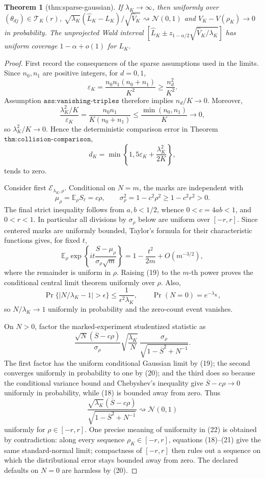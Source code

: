 \documentclass{article}
\newtheorem{theorem}{Theorem}
\begin{document}
\begin{theorem}[thm:sparse-gaussian]\label{thm:sparse-gaussian}
If \(\lambda_K\to\infty\), then uniformly over \((\theta_{dj})\in\mathcal T_K(r)\), \(\sqrt{\lambda_K}(\widehat L_K-L_K)/\sqrt{\widehat V_K}\rightsquigarrow\mathcal N(0,1)\) and \(\widehat V_K-V(\rho_K)\to0\) in probability. The unprojected Wald interval \([\widehat L_K\pm z_{1-\alpha/2}\sqrt{\widehat V_K/\lambda_K}]\) has uniform coverage \(1-\alpha+o(1)\) for \(L_K\).
\end{theorem}
\begin{proof}
First record the consequences of the sparse assumptions used in the
limits.  Since \(n_0,n_1\) are positive integers, for \(d=0,1\),
\[
 \varepsilon_K
 =\frac{n_0n_1(n_0+n_1)}{K^2}
 \ge \frac{n_d^2}{K^2}.
 \tag{15}
\]
Assumption \(\texttt{ass:vanishing-triples}\) therefore implies
\(n_d/K\to0\).  Moreover,
\[
 \frac{\lambda_K^2/K}{\varepsilon_K}
 =
 \frac{n_0n_1}{K(n_0+n_1)}
 \le\frac{\min(n_0,n_1)}K
 \longrightarrow0,
 \tag{16}
\]
so \(\lambda_K^2/K\to0\).  Hence the deterministic comparison error in
Theorem \(\texttt{thm:collision-comparison}\),
\[
 d_K=\min\left\{1,5\varepsilon_K+\frac{\lambda_K^2}{2K}\right\},
 \tag{17}
\]
tends to zero.

Consider first \(\mathcal E_{\lambda_K,\rho}\).  Conditional on \(N=m\),
the marks are independent with
\[
 \mu_\rho=\mathbb E_\rho S_\ell=c\rho,
 \qquad
 \sigma_\rho^2=1-c^2\rho^2
 \ge1-c^2r^2>0.
 \tag{18}
\]
The final strict inequality follows from \(a,b<1/2\), whence
\(0<c=4ab<1\), and \(0<r<1\).  In particular all divisions by
\(\sigma_\rho\) below are uniform over \([-r,r]\).  Since centered marks
are uniformly bounded, Taylor's formula for their characteristic
functions gives, for fixed \(t\),
\[
 \mathbb E_\rho\exp\left\{
 it\frac{S-\mu_\rho}{\sigma_\rho\sqrt m}
 \right\}
 =1-\frac{t^2}{2m}+O(m^{-3/2}),
 \tag{19}
\]
where the remainder is uniform in \(\rho\).  Raising (19) to the
\(m\)-th power proves the conditional central limit theorem uniformly
over \(\rho\).  Also,
\[
 \Pr\{|N/\lambda_K-1|>\epsilon\}
 \le\frac{1}{\epsilon^2\lambda_K},
 \qquad
 \Pr(N=0)=e^{-\lambda_K},
 \tag{20}
\]
so \(N/\lambda_K\to1\) uniformly in probability and the zero-count
event vanishes.

On \(N>0\), factor the marked-experiment studentized statistic as
\[
 \frac{\sqrt N(\overline S-c\rho)}{\sigma_\rho}
 \sqrt{\frac{\lambda_K}{N}}\,
 \frac{\sigma_\rho}
 {\sqrt{1-\overline S^2+N^{-1}}}.
 \tag{21}
\]
The first factor has the uniform conditional Gaussian limit by (19);
the second converges uniformly in probability to one by (20); and the
third does so because the conditional variance bound and Chebyshev's
inequality give
\(\overline S-c\rho\to0\) uniformly in probability, while (18) is
bounded away from zero.  Thus
\[
 \frac{\sqrt{\lambda_K}(\overline S-c\rho)}
 {\sqrt{1-\overline S^2+N^{-1}}}
 \rightsquigarrow\mathcal N(0,1)
 \tag{22}
\]
uniformly for \(\rho\in[-r,r]\).  One precise meaning of uniformity in
(22) is obtained by contradiction: along every sequence
\(\rho_K\in[-r,r]\), equations (18)--(21) give the same standard-normal
limit; compactness of \([-r,r]\) then rules out a sequence on which the
distributional error stays bounded away from zero.  The declared
defaults on \(N=0\) are harmless by (20).


\end{proof}
\end{document}
